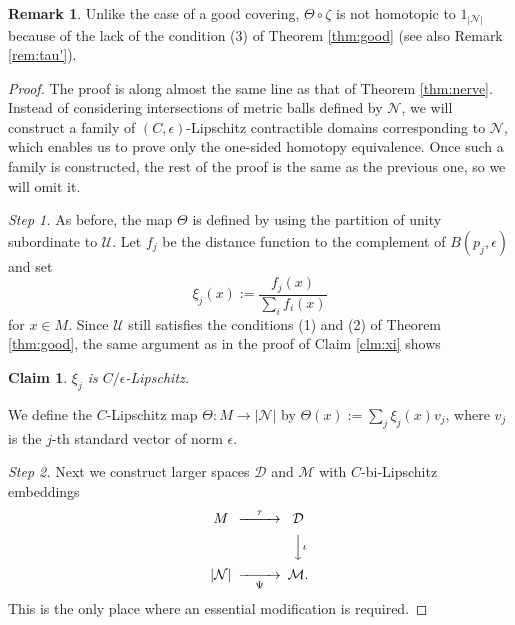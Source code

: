 \documentclass[a4paper,12pt]{amsart}
\theoremstyle{plain}
\newtheorem{clm}[thm]{Claim}
\theoremstyle{definition}
\newtheorem{rem}[thm]{Remark}
\numberwithin{thm}{section}
\numberwithin{equation}{section}
\newcommand{\step}[1]{\medskip\noindent\textit{#1.}}
\begin{document}
\begin{rem}
Unlike the case of a good covering, $\Theta\circ\zeta$ is not homotopic to $1_{|\mathcal N|}$ because of the lack of the condition (3) of Theorem \ref{thm:good} (see also Remark \ref{rem:tau'}).
\end{rem}

\begin{proof}
The proof is along almost the same line as that of Theorem \ref{thm:nerve}.
Instead of considering intersections of metric balls defined by $\mathcal N$, we will construct a family of $(C,\epsilon)$-Lipschitz contractible domains corresponding to $\mathcal N$, which enables us to prove only the one-sided homotopy equivalence.
Once such a family is constructed, the rest of the proof is the same as the previous one, so we will omit it.

\step{Step 1}
As before, the map $\Theta$ is defined by using the partition of unity subordinate to $\mathcal U$.
Let $f_j$ be the distance function to the complement of $B(p_j,\epsilon)$ and set
\[\xi_j(x):=\frac{f_j(x)}{\sum_i f_i(x)}\]
for $x\in M$.
Since $\mathcal U$ still satisfies the conditions (1) and (2) of Theorem \ref{thm:good}, the same argument as in the proof of Claim \ref{clm:xi} shows

\begin{clm}\label{clm:xi'}
$\xi_j$ is $C/\epsilon$-Lipschitz.
\end{clm}

We define the $C$-Lipschitz map $\Theta:M\to |\mathcal N|$ by $\Theta(x):=\sum_j\xi_j(x)v_j$, where $v_j$ is the $j$-th standard vector of norm $\epsilon$.

\step{Step 2}
Next we construct larger spaces $\mathcal D$ and $\mathcal M$ with $C$-bi-Lipschitz embeddings
\[
\begin{CD}
M @>\tau >> \mathcal D\\
@.
@VV{\iota}V \\
|\mathcal N| @>>\Psi> \mathcal M.
\end{CD}
\]
This is the only place where an essential modification is required.


\end{proof}
\end{document}
